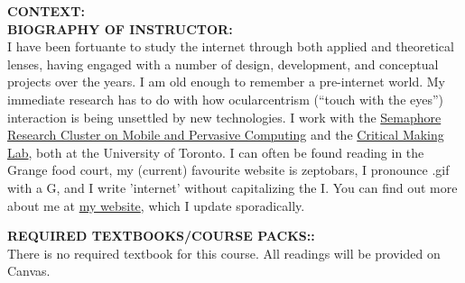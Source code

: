 \documentclass[10pt]{article}
\begin{document}

\textbf{CONTEXT:}\\

\textbf{BIOGRAPHY OF INSTRUCTOR:}\\
I have been fortuante to study the internet through both applied and theoretical lenses, having engaged with a number of design, development, and conceptual projects over the years. I am old enough to remember a pre-internet world. My immediate research has to do with how ocularcentrism (``touch with the eyes'') interaction is being unsettled by new technologies. I work with the \href{http://semaphore.utoronto.ca}{Semaphore Research Cluster on Mobile and Pervasive Computing} and the \href{http://criticalmaking.com}{Critical Making Lab}, both at the University of Toronto. I can often be found reading in the Grange food court, my (current) favourite website is zeptobars, I pronounce .gif with a G, and I write 'internet' without capitalizing the I. You can find out more about me at \href{http://losingtime.ca}{my website}, which I update sporadically. 

\textbf{REQUIRED TEXTBOOKS/COURSE PACKS::}\\
There is no required textbook for this course. All readings will be provided on Canvas. 
\end{document}
